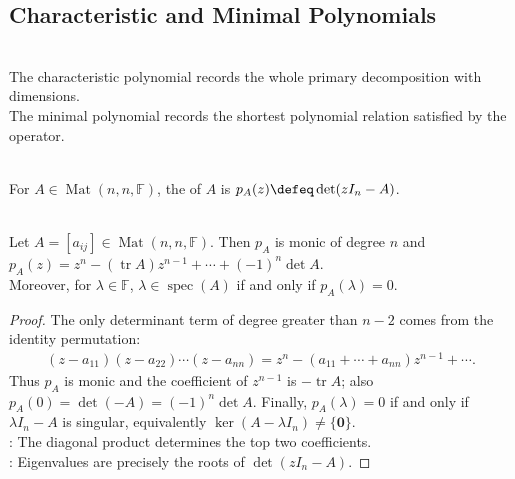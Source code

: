 \subsection{Characteristic and Minimal Polynomials}

\begin{motivation} \label{mot:characteristic-and-minimal-polynomials} \\
The characteristic polynomial records the whole primary decomposition with dimensions.\\
The minimal polynomial records the shortest polynomial relation satisfied by the operator.
\end{motivation}

\begin{definition} \label{def:matrix-characteristic-polynomial} \\
For $A\in\operatorname{Mat}(n,n,\mathbb{F})$, the  of $A$ is $p_A(z)\defeq\det(zI_n-A)$.
\end{definition}

\begin{theorem} \label{thm:matrix-characteristic-polynomial-basic-coefficients} \\
Let $A=[a_{ij}]\in\operatorname{Mat}(n,n,\mathbb{F})$. Then $p_A$ is monic of degree $n$ and $p_A(z)=z^n-(\operatorname{tr}A)z^{n-1}+\cdots+(-1)^n\det A$.\\
Moreover, for $\lambda\in\mathbb{F}$, $\lambda\in\operatorname{spec}(A)$ if and only if $p_A(\lambda)=0$.
\begin{proof}
The only determinant term of degree greater than $n-2$ comes from the identity permutation:
\begin{align}
(z-a_{11})(z-a_{22})\cdots(z-a_{nn})=z^n-(a_{11}+\cdots+a_{nn})z^{n-1}+\cdots.
\nonumber
\end{align}
Thus $p_A$ is monic and the coefficient of $z^{n-1}$ is $-\operatorname{tr}A$; also $p_A(0)=\det(-A)=(-1)^n\det A$. Finally, $p_A(\lambda)=0$ if and only if $\lambda I_n-A$ is singular, equivalently $\ker(A-\lambda I_n)\neq\{\mathbf{0}\}$.\\
: The diagonal product determines the top two coefficients.\\
: Eigenvalues are precisely the roots of $\det(zI_n-A)$.
\end{proof}
\end{theorem}

